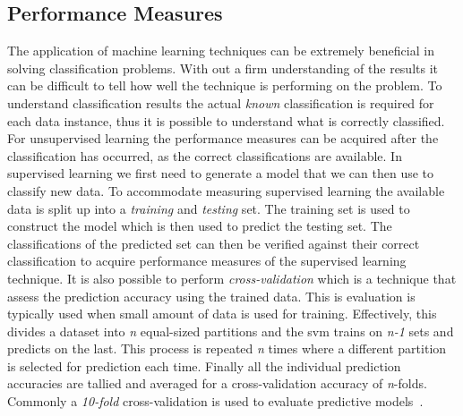 \subsection{Performance Measures}
\label{subsec:background_performance_measures}
The application of machine learning techniques can be extremely beneficial in solving classification problems. With out a firm understanding of the results it can be difficult to tell how well the technique is performing on the problem. To understand classification results the actual \emph{known} classification is required for each data instance, thus it is possible to understand what is correctly classified. For unsupervised learning the performance measures can be acquired after the classification has occurred, as the correct classifications are available. In supervised learning we first need to generate a model that we can then use to classify new data. To accommodate measuring supervised learning the available data is split up into a \emph{training} and \emph{testing} set. The training set is used to construct the model which is then used to predict the testing set. The classifications of the predicted set can then be verified against their correct classification to acquire performance measures of the supervised learning technique. It is also possible to perform \emph{cross-validation} which is a technique that assess the prediction accuracy using the trained data. This is evaluation is typically used when small amount of data is used for training. Effectively, this divides a dataset into \emph{n} equal-sized partitions and the \gls{svm} trains on \emph{n-1} sets and predicts on the last. This process is repeated \emph{n} times where a different partition is selected for prediction each time. Finally all the individual prediction accuracies are tallied and averaged for a cross-validation accuracy of \emph{n}-folds. Commonly a \emph{10-fold} cross-validation is used to evaluate predictive models~\cite{Koh95}.

